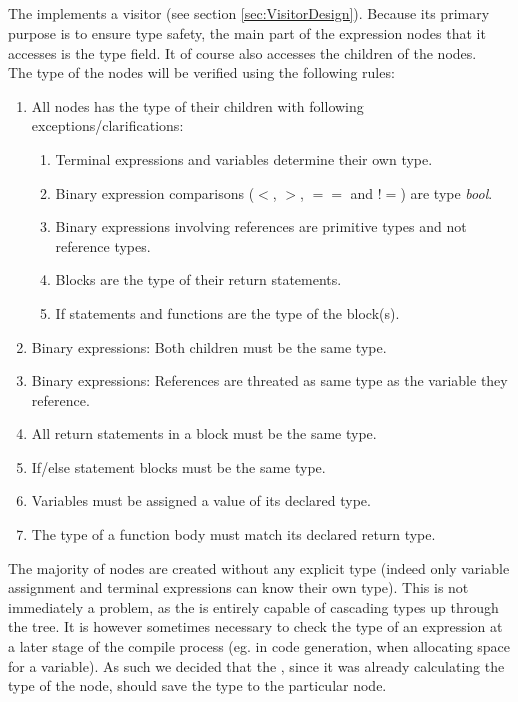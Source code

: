 \subsection{\typeChecker{}}
\label{sec:typeCheckerDesign}
The \typeChecker{} implements a visitor (see section \ref{sec:VisitorDesign}). 
Because its primary purpose is to ensure type safety, the main part of the expression
nodes that it accesses is the type field. It of course also accesses the children of
the nodes.\\

The type of the nodes will be verified using the following rules:
\begin{enumerate}

\item All nodes has the type of their children with following exceptions/clarifications:
\begin{enumerate}
\item Terminal expressions and variables determine their own type.
\item Binary expression comparisons ($<$, $>$, $==$ and $!=$) are type \textit{bool}.
\item Binary expressions involving references are primitive types and not reference
  types.
\item Blocks are the type of their return statements. 
\item If statements and functions are the type of the block(s).
\end{enumerate}
\item Binary expressions: Both children must be the same type.
\item Binary expressions: References are threated as same type as the
  variable they reference.
\item All return statements in a block must be the same type.
\item If/else statement blocks must be the same type.
\item Variables must be assigned a value of its declared type.
\item The type of a function body must match its declared return type.
\end{enumerate}

The majority of nodes are created without any explicit type (indeed only variable
assignment and terminal expressions can know their own type). This is not immediately
a problem, as the \typeChecker{} is entirely capable of cascading types up through the
tree. It is however sometimes necessary to check the type of an expression at a later
stage of the compile process (eg. in code generation, when allocating space for a
variable). As such we decided that the \typeChecker, since it was already calculating
the type of the node, should save the type to the particular node.

